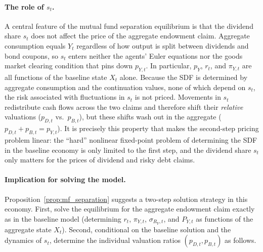 \documentclass[11pt,english]{article}
\begin{document}
\paragraph{The role of $s_t$.}
A central feature of the mutual fund separation equilibrium is that the dividend share $s_t$ does not affect the price of the aggregate endowment claim. Aggregate consumption equals $Y_t$ regardless of how output is split between dividends and bond coupons, so $s_t$ enters neither the agents' Euler equations nor the goods market clearing condition that pins down $p_{Y,t}$. In particular, $p_Y$, $r_t$, and $\pi_{Y,t}$ are all functions of the baseline state $X_t$ alone. Because the SDF is determined by aggregate consumption and the continuation values, none of which depend on $s_t$, the risk associated with fluctuations in $s_t$ is not priced. Movements in $s_t$ redistribute cash flows across the two claims and therefore shift their \emph{relative} valuations ($p_{D,t}$ vs.\ $p_{B,t}$), but these shifts wash out in the aggregate ($p_{D,t}+p_{B,t}=p_{Y,t}$). It is precisely this property that makes the second-step pricing problem linear: the ``hard'' nonlinear fixed-point problem of determining the SDF in the baseline economy is only limited to the first step, and the dividend share $s_t$ only matters for the prices of dividend and risky debt claims.

\paragraph{Implication for solving the model.}
Proposition~\ref{prop:mf_separation} suggests a two-step solution strategy in this economy. First, solve the equilibrium for the aggregate endowment claim exactly as in the baseline model (determining $r_t$, $\pi_{Y,t}$, $\sigma_{R_Y,t}$, and $P_{Y,t}$ as functions of the aggregate state $X_t$). Second, conditional on the baseline solution and the dynamics of $s_t$, determine the individual valuation ratios $(p_{D,t},p_{B,t})$ as follows.
\end{document}
